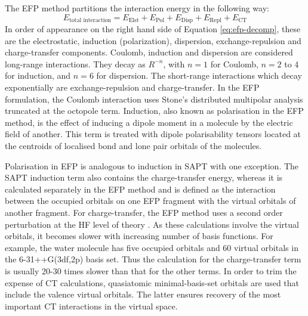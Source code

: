 The EFP method partitions the interaction energy in the following way:
\begin{equation}
    \label{eq:efp-decomp}
    E_{\text{total interaction}} = E_{\text{Elst}} + E_{\text{Pol}} + E_{\text{Disp}} + 
                                    E_{\text{Repl}} + E_{\text{CT}}
\end{equation}
In order of appearance on the right hand side of Equation \ref{eq:efp-decomp}, these are the electrostatic, induction (polarization), dispersion, exchange-repulsion and charge-transfer components.
Coulomb, induction and dispersion are considered long-range interactions.
They decay as $R^{-n}$, with $n = 1$ for Coulomb, $n = 2$ to 4 for induction, and $n = 6$ for dispersion.
The short-range interactions which decay exponentially are exchange-repulsion and charge-transfer.
In the EFP formulation, the Coulomb interaction uses Stone's distributed multipolar analysis 
\cite{Stone1996a} truncated at the octopole term.
Induction, also known as polarisation in the EFP method, is the effect of inducing a dipole moment in a molecule by the electric field of another.
This term is treated with dipole polarisability tensors located at the centroids of localised bond and lone pair orbitals of the molecules.
\cite{Li2006a}


Polarisation in EFP is analogous to induction in SAPT with one exception. 
The SAPT induction term also contains the charge-transfer energy, whereas it is calculated separately in the EFP method and is defined as the interaction between the occupied orbitals on one EFP fragment with the virtual orbitals of another fragment. 
For charge-transfer, the EFP method uses a second order perturbation at the HF level of theory
\cite{Li2006a}.
As these calculations involve the virtual orbitals, it becomes slower with increasing number of basis functions. 
For example, the water molecule has five occupied orbitals and 60 virtual orbitals in the 6-31++G(3df,2p) basis set. 
Thus the calculation for the charge-transfer term is usually 20-30 times slower than that for the other terms.
\cite{Li2006a}
In order to trim the expense of CT calculations, quasiatomic minimal-basis-set orbitals 
\cite{Lu2004a} 
are used that include the valence virtual orbitals. The latter ensures recovery of the most important CT interactions in the virtual space.


